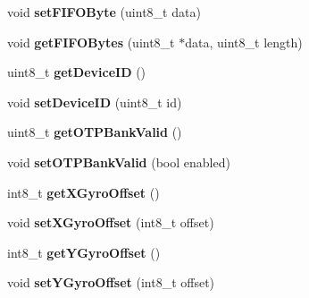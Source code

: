 \begin{DoxyCompactItemize}
\item 
\hypertarget{class_m_p_u6050_a66da5bc38aa82404117d1ef5306c951a}{void {\bfseries set\+F\+I\+F\+O\+Byte} (uint8\+\_\+t data)}\label{class_m_p_u6050_a66da5bc38aa82404117d1ef5306c951a}

\item 
\hypertarget{class_m_p_u6050_aba36dcb767b5cd8965053987aaa08a6a}{void {\bfseries get\+F\+I\+F\+O\+Bytes} (uint8\+\_\+t $\ast$data, uint8\+\_\+t length)}\label{class_m_p_u6050_aba36dcb767b5cd8965053987aaa08a6a}

\item 
\hypertarget{class_m_p_u6050_a35ae3c8894b3258e642043886801e031}{uint8\+\_\+t {\bfseries get\+Device\+I\+D} ()}\label{class_m_p_u6050_a35ae3c8894b3258e642043886801e031}

\item 
\hypertarget{class_m_p_u6050_aaefb4b3d93cf4b78d56cd63b10ea0e97}{void {\bfseries set\+Device\+I\+D} (uint8\+\_\+t id)}\label{class_m_p_u6050_aaefb4b3d93cf4b78d56cd63b10ea0e97}

\item 
\hypertarget{class_m_p_u6050_a6eb099e3dc96eb4d113cf81804256e8c}{uint8\+\_\+t {\bfseries get\+O\+T\+P\+Bank\+Valid} ()}\label{class_m_p_u6050_a6eb099e3dc96eb4d113cf81804256e8c}

\item 
\hypertarget{class_m_p_u6050_a074024a7818b2998b3f1c99064bea3a0}{void {\bfseries set\+O\+T\+P\+Bank\+Valid} (bool enabled)}\label{class_m_p_u6050_a074024a7818b2998b3f1c99064bea3a0}

\item 
\hypertarget{class_m_p_u6050_a4d71a79f90f97f8ea0f88825502789b8}{int8\+\_\+t {\bfseries get\+X\+Gyro\+Offset} ()}\label{class_m_p_u6050_a4d71a79f90f97f8ea0f88825502789b8}

\item 
\hypertarget{class_m_p_u6050_ad0c66eb7f77ab0ef19fca7124c63ba9d}{void {\bfseries set\+X\+Gyro\+Offset} (int8\+\_\+t offset)}\label{class_m_p_u6050_ad0c66eb7f77ab0ef19fca7124c63ba9d}

\item 
\hypertarget{class_m_p_u6050_a829d38a14ad1096ea73ee628cdf03b53}{int8\+\_\+t {\bfseries get\+Y\+Gyro\+Offset} ()}\label{class_m_p_u6050_a829d38a14ad1096ea73ee628cdf03b53}

\item 
\hypertarget{class_m_p_u6050_a7f547a52a20bc1ebb23faa1e6668bff1}{void {\bfseries set\+Y\+Gyro\+Offset} (int8\+\_\+t offset)}\label{class_m_p_u6050_a7f547a52a20bc1ebb23faa1e6668bff1}


\end{DoxyCompactItemize}
